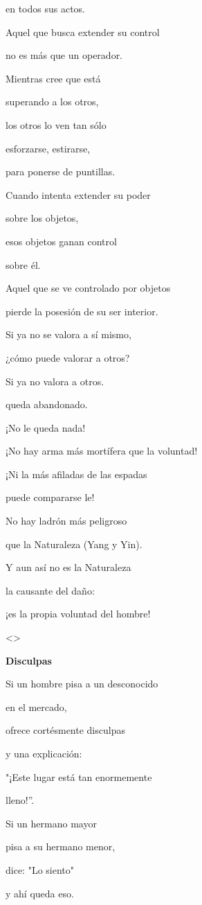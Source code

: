 en todos sus actos.

Aquel que busca extender su control

no es más que un operador.

Mientras cree que está

superando a los otros,

los otros lo ven tan sólo

esforzarse, estirarse,

para ponerse de puntillas.

Cuando intenta extender su poder

sobre los objetos,

esos objetos ganan control

sobre él.

Aquel que se ve controlado por objetos

pierde la posesión de su ser interior.

Si ya no se valora a sí mismo,

¿cómo puede valorar a otros?

Si ya no valora a otros.

queda abandonado.

¡No le queda nada!

¡No hay arma más mortífera que la voluntad!

¡Ni la más afiladas de las espadas

puede compararse le!

No hay ladrón más peligroso

que la Naturaleza (Yang y Yin).

Y aun así no es la Naturaleza

la causante del daño:

¡es la propia voluntad del hombre!

\textless\textgreater{}

\textbf{{Disculpas}}

Si un hombre pisa a un desconocido

en el mercado,

ofrece cortésmente disculpas

y una explicación:

"¡Este lugar está tan enormemente

lleno!''.

Si un hermano mayor

pisa a su hermano menor,

dice: "Lo siento"

y ahí queda eso.

